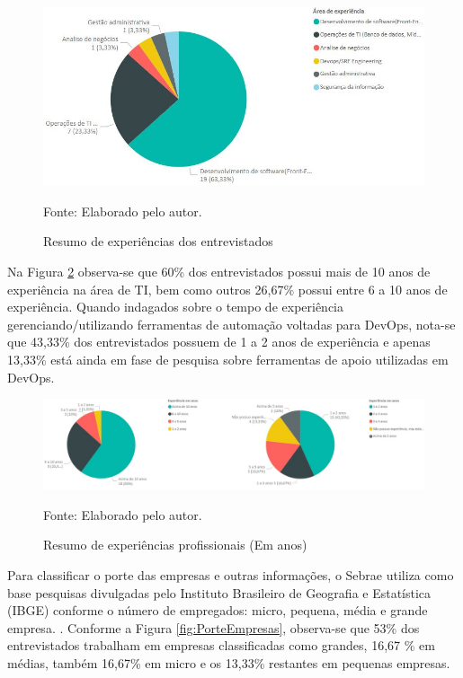 \documentclass[twoside,english,brazilian]{UNISINOSartigo}
\newcommand{\source}[1]{\caption*{Fonte: {#1}} }
\begin{document}
\begin{figure}[H]
    \centering
       \caption{Resumo de experiências dos entrevistados}
       \includegraphics[scale=.6]{imagens/exp_pbi.jpg}
      \source{Elaborado pelo autor.}
    \label{fig:experiencias}
\end{figure}

Na Figura \ref{fig:expAns} observa-se que 60\% dos entrevistados possui mais de 10 anos de experiência na área de TI, bem como outros 26,67\% possui entre 6 a 10 anos de experiência. Quando indagados sobre o tempo de experiência gerenciando/utilizando ferramentas de automação voltadas para DevOps, nota-se que 43,33\% dos entrevistados possuem de 1 a 2 anos de experiência e apenas 13,33\% está ainda em fase de pesquisa sobre ferramentas de apoio utilizadas em DevOps. 

\begin{figure}[H]
    \centering
     \caption{Resumo de experiências profissionais (Em anos)}
     \includegraphics[scale=.5]{imagens/tempoExperiencia_pbi.jpg}
     \source{Elaborado pelo autor.}
    \label{fig:expAns}
\end{figure}

Para classificar o porte das empresas e outras informações, o Sebrae utiliza como base pesquisas divulgadas pelo Instituto Brasileiro de Geografia e Estatística (IBGE) conforme o número de empregados: micro, pequena, média e grande empresa. \citep{SEBRAE2017}. 
Conforme a Figura \ref{fig:PorteEmpresas}, observa-se que 53\% dos entrevistados trabalham em empresas classificadas como grandes, 16,67 \% em médias,  também 16,67\% em micro e os 13,33\% restantes em pequenas empresas. 
\end{document}
